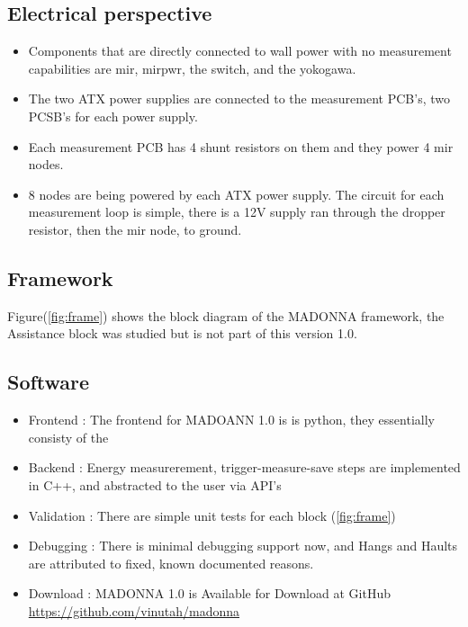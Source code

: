 \documentclass[letterpaper, 10 pt, conference]{ieeeconf}
\begin{document}
\subsection{Electrical perspective}

\begin{itemize}
  \item Components that are directly connected to wall power with no measurement capabilities are mir, mirpwr, the switch, and the yokogawa.

  \item The two ATX power supplies are connected to the measurement PCB's, two PCSB's for each power supply. 
  \item Each measurement PCB has 4 shunt resistors on them and they power 4 mir nodes. 
  \item 8 nodes are being powered by each ATX power supply. The circuit for each measurement loop is simple, 
        there is a 12V supply ran through the dropper resistor, then the mir node, to ground.

\end{itemize}
\subsection{Framework}

Figure(\ref{fig:frame}) shows the block diagram of the MADONNA framework, the Assistance
block was studied but is not part of this version 1.0.

\subsection{Software}

\begin{itemize}
  \item Frontend   : The frontend for MADOANN 1.0 is is python, they essentially consisty of the 
  \item Backend    : Energy measurerement, trigger-measure-save steps are implemented in C++, and abstracted to the user via API's
  \item Validation : There are simple unit tests for each block (\ref{fig:frame})
  \item Debugging  : There is minimal debugging support now, and Hangs and Haults are attributed to fixed, known documented reasons.
  \item Download   : MADONNA 1.0 is Available for Download at GitHub \url{https://github.com/vinutah/madonna}

  \end{itemize}
\end{document}
